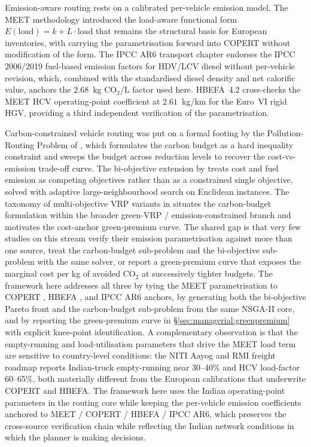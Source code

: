 \documentclass[review,preprint,authoryear,12pt]{elsarticle}
\newcommand{\COtwo}{\ensuremath{\mathrm{CO}_{2}}}
\begin{document}
Emission-aware routing rests on a calibrated per-vehicle emission
model. The MEET methodology \citep{hickman1999meet} introduced the
load-aware functional form
$E(\mathrm{load}) = k + L \cdot \mathrm{load}$
that remains the structural basis for European inventories, with
\citet{ntziachristos2009copert} carrying the parametrisation forward
into COPERT without modification of the form. The IPCC AR6 transport
chapter \citep{ipcc2022ar6_transport} endorses the IPCC 2006/2019
fuel-based emission factors for HDV/LCV diesel without per-vehicle
revision, which, combined with the standardised diesel density and
net calorific value, anchors the $2.68$~kg \COtwo{}/L factor used
here. HBEFA~4.2 \citep{hbefa42_2022} cross-checks the MEET HCV
operating-point coefficient at $2.61$~kg/km for the Euro~VI rigid
HGV, providing a third independent verification of the
parametrisation.

Carbon-constrained vehicle routing was put on a formal footing by
the Pollution-Routing Problem of \citet{bektas2011prp}, which
formulates the carbon budget as a hard inequality constraint and
sweeps the budget across reduction levels to recover the
cost-vs-emission trade-off curve. The bi-objective extension by
\citet{demir2014bi_objective_prp} treats cost and fuel emission as
competing objectives rather than as a constrained single objective,
solved with adaptive large-neighbourhood search on Euclidean
instances. The taxonomy of multi-objective VRP variants in
\citet{sweeney2017movrp_taxonomy} situates the carbon-budget
formulation within the broader green-VRP / emission-constrained
branch and motivates the cost-anchor green-premium curve. The shared
gap is that very few studies on this stream verify their emission
parametrisation against more than one source, treat the carbon-budget
sub-problem and the bi-objective sub-problem with the same solver, or
report a green-premium curve that exposes the marginal cost per kg of
avoided \COtwo{} at successively tighter budgets. The framework here
addresses all three by tying the MEET parametrisation to COPERT
\citep{ntziachristos2009copert}, HBEFA \citep{hbefa42_2022}, and
IPCC AR6 \citep{ipcc2022ar6_transport} anchors, by generating both
the bi-objective Pareto front and the carbon-budget sub-problem from
the same NSGA-II core, and by reporting the green-premium curve in
\S\ref{sec:managerial:greenpremium} with explicit knee-point
identification. A complementary observation is that the empty-running
and load-utilisation parameters that drive the MEET load term are
sensitive to country-level conditions: the NITI Aayog and RMI freight
roadmap \citep{niti_rmi_2021_freight} reports Indian-truck
empty-running near 30--40\% and HCV load-factor 60--65\%, both
materially different from the European calibrations that underwrite
COPERT and HBEFA. The framework here uses the Indian operating-point
parameters in the routing core while keeping the per-vehicle emission
coefficients anchored to MEET / COPERT / HBEFA / IPCC AR6, which
preserves the cross-source verification chain while reflecting the
Indian network conditions in which the planner is making decisions.
\end{document}
